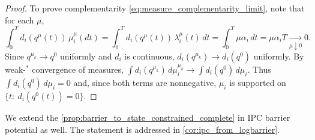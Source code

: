 \begin{proof}
To prove complementarity \cref{eq:measure_complementarity_limit}, note that for each $\mu$,
\[
\int_0^T d_i(q^\mu(t))\,\mu_i^\mu(dt)
=\int_0^T d_i(q^\mu(t))\,\lambda_i^\mu(t)\,dt
=\int_0^T \mu\alpha_i\,dt
=\mu\alpha_i T \xrightarrow[\mu\downarrow 0]{} 0.
\]
Since $q^{\mu_k}\to q^0$ uniformly and $d_i$ is continuous, $d_i(q^{\mu_k})\to d_i(q^0)$ uniformly.
By weak-$^\ast$ convergence of measures, $\int d_i(q^{\mu_k})\,d\mu_i^{\mu_k}\to \int d_i(q^0)\,d\mu_i$.
Thus $\int d_i(q^0)\,d\mu_i=0$ and, since both terms are nonnegative, $\mu_i$ is supported on $\{t:\ d_i(q^0(t))=0\}$.
\end{proof}

We extend the \cref{prop:barrier_to_state_constrained_complete} in IPC barrier potential as well. The statement is addressed in \cref{cor:ipc_from_logbarrier}.

